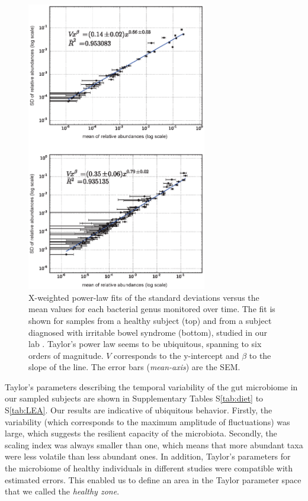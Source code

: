 \begin{figure}
	\centering
	\includegraphics[width=0.7\textwidth]{figs/Fig1.eps}
	\caption{X-weighted power-law fits of the standard deviations versus the mean values for each bacterial genus monitored over time. The fit is shown for samples from a healthy subject (top) and from a subject diagnosed with irritable bowel syndrome (bottom), studied in our lab \cite{IBS}. Taylor's power law seems to be ubiquitous, spanning to six orders of magnitude. $V$ corresponds to the y-intercept and $\beta$ to the slope of the line. The error bars (\emph{mean-axis}) are the SEM.}
	\label{fig:main1}
\end{figure}

Taylor's parameters describing the temporal variability of the gut microbiome in our sampled subjects are shown in Supplementary Tables S\ref{tab:diet} to S\ref{tab:LEA}. Our results are indicative of ubiquitous behavior. Firstly, the variability (which corresponds to the maximum amplitude of fluctuations) was large, which suggests the resilient capacity of the microbiota. Secondly, the scaling index was always smaller than one, which means that more abundant taxa were less volatile than less abundant ones. In addition, Taylor's parameters for the microbiome of healthy individuals in different studies  \cite{IBS,moving,antibiotic,LEA,kwashiorkor,diet,hostlife} were compatible with estimated errors. This enabled us to define an area in the Taylor parameter space that we called the \emph{healthy zone}. 

